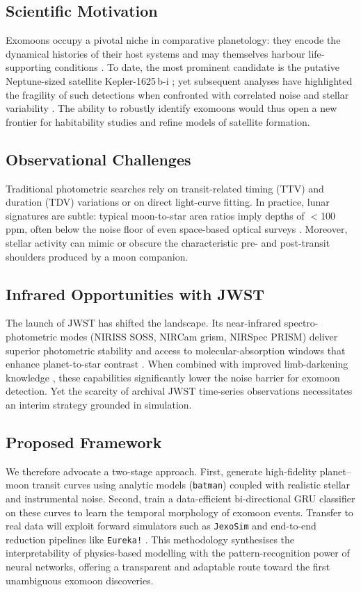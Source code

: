 \documentclass[11pt]{article}
\begin{document}
\subsection{Scientific Motivation}
Exomoons occupy a pivotal niche in comparative planetology: they encode the dynamical histories of their host systems and may themselves harbour life‐supporting conditions \citep{HellerBarnes2013}.  To date, the most prominent candidate is the putative Neptune-sized satellite Kepler-1625\,b-i \citep{TeacheyKipping2018}; yet subsequent analyses have highlighted the fragility of such detections when confronted with correlated noise and stellar variability \citep{Kreidberg2019}.  The ability to robustly identify exomoons would thus open a new frontier for habitability studies and refine models of satellite formation.

\subsection{Observational Challenges}
Traditional photometric searches rely on transit-related timing (TTV) and duration (TDV) variations \citep{Heller2016TTVTDV} or on direct light-curve fitting.  In practice, lunar signatures are subtle: typical moon-to-star area ratios imply depths of $<$100 ppm, often below the noise floor of even space-based optical surveys \citep{Rodenbeck2020}.  Moreover, stellar activity can mimic or obscure the characteristic pre- and post-transit shoulders produced by a moon companion.

\subsection{Infrared Opportunities with JWST}
The launch of JWST has shifted the landscape.  Its near-infrared spectro-photometric modes (NIRISS SOSS, NIRCam grism, NIRSpec PRISM) deliver superior photometric stability and access to molecular-absorption windows that enhance planet-to-star contrast \citep{Rustamkulov2024}.  When combined with improved limb-darkening knowledge \citep{Claret2023}, these capabilities significantly lower the noise barrier for exomoon detection.  Yet the scarcity of archival JWST time-series observations necessitates an interim strategy grounded in simulation.

\subsection{Proposed Framework}
We therefore advocate a two-stage approach.  First, generate high-fidelity planet–moon transit curves using analytic models (\texttt{batman}) coupled with realistic stellar and instrumental noise.  Second, train a data-efficient bi-directional GRU classifier on these curves to learn the temporal morphology of exomoon events.  Transfer to real data will exploit forward simulators such as \texttt{JexoSim} \citep{Sarkar2024} and end-to-end reduction pipelines like \texttt{Eureka!} \citep{Bell2023}.  This methodology synthesises the interpretability of physics-based modelling with the pattern-recognition power of neural networks, offering a transparent and adaptable route toward the first unambiguous exomoon discoveries.
\end{document}
